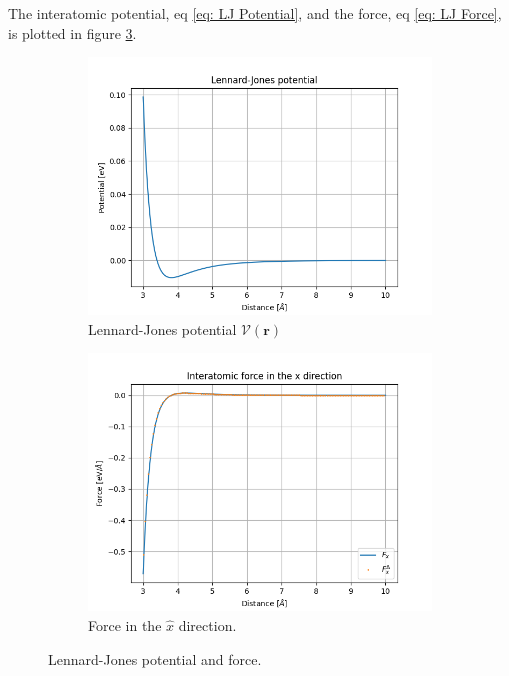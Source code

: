 \documentclass[a4paper]{article}
\begin{document}
The interatomic potential, eq \eqref{eq: LJ Potential}, and the force, eq \eqref{eq: LJ Force}, is plotted in figure \ref{fig: Interatomic potential and force}.
\begin{figure}[H]
    \centering
    \begin{subfigure}[b]{0.45\textwidth}
        \centering
        \includegraphics[width=\textwidth]{Lennard-Jones potential.png}
        \caption{Lennard-Jones potential $\mathcal{V}(\mathbf{r})$}
        \label{fig: Interatomic potential}
    \end{subfigure}
    \hfill
    \begin{subfigure}[b]{0.45\textwidth}
        \centering
        \includegraphics[width=\textwidth]{Interatomic force in the x direction.png}
        \caption{Force in the $\hat{x}$ direction.}
        \label{fig:Interatomic force}
    \end{subfigure}
    \caption{Lennard-Jones potential and force.}
    \label{fig: Interatomic potential and force}
\end{figure}\noindent
\end{document}
